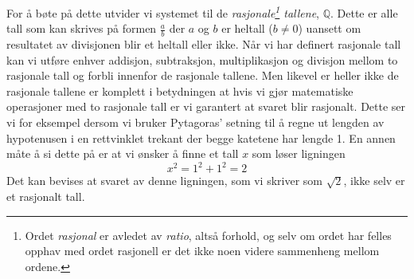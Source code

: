 \documentclass[a4paper,norsk,12pt]{article}
\begin{document}
For å bøte på dette utvider vi systemet til de \emph{rasjonale\footnote{Ordet \emph{rasjonal} er avledet av \emph{ratio}, altså forhold, og selv om ordet har felles opphav med ordet rasjonell er det ikke noen videre sammenheng mellom ordene.} tallene}, $\mathbb{Q}$. Dette er alle tall som kan skrives på formen $\frac{a}{b}$ der $a$ og $b$ er heltall ($b\neq0$) uansett om resultatet av divisjonen blir et heltall eller ikke. Når vi har definert rasjonale tall kan vi utføre enhver addisjon, subtraksjon, multiplikasjon og divisjon mellom to rasjonale tall og forbli innenfor de rasjonale tallene. Men likevel er heller ikke de rasjonale tallene er komplett i betydningen at hvis vi gjør matematiske operasjoner med to rasjonale tall er vi garantert at svaret blir rasjonalt. Dette ser vi for eksempel dersom vi bruker Pytagoras' setning til å regne ut lengden av hypotenusen i en rettvinklet trekant der begge katetene har lengde 1. En annen måte å si dette på er at vi ønsker å finne et tall $x$ som løser ligningen
\begin{displaymath}
	x^2 = 1^2 + 1^2 = 2
\end{displaymath}
Det kan bevises at svaret av denne ligningen, som vi skriver som $\sqrt{2}$, ikke selv er et rasjonalt tall. 

\end{document}
